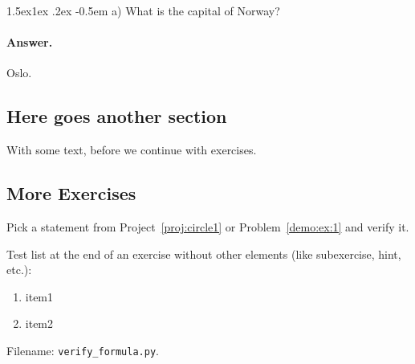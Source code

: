 \documentclass[%
oneside,                 %
final,                   %
10pt]{article}
\makeatletter
\newenvironment{doconceexercise}{}{}
\newcounter{doconceexercisecounter}
\newcommand\subex{\@startsection{paragraph}{4}{\z@}%
                  {1.5ex\@plus1ex \@minus.2ex}%
                  {-0.5em}%
                  {\normalfont\normalsize\bfseries}}
\theoremstyle{definition}
\makeatother
\begin{document}
\begin{enumerate}
\begin{doconceexercise}
\subex{a)}
What is the capital of Norway?

\paragraph{Answer.}
Oslo.


\end{doconceexercise}

\subsection{Here goes another section}

With some text, before we continue with exercises.

\subsection{More Exercises}

\begin{doconceexercise}

                             
\label{exer:some:formula}

Pick a statement from Project~\vref{proj:circle1} or Problem~\vref{demo:ex:1}
and verify it.

Test list at the end of an exercise without other elements (like subexercise,
hint, etc.):

\begin{enumerate}
\item item1

\item item2
\end{enumerate}

\noindent
\noindent Filename: \Verb!verify_formula.py!.

\end{doconceexercise}

\begin{doconceexercise}

                             

\end{doconceexercise}
\end{enumerate}
\end{document}
